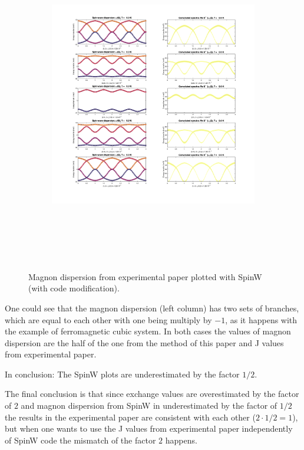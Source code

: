 \documentclass[a4paper,12pt]{article}
\begin{document}
            \begin{figure}[H]
                \centering
                \begin{subfigure}[b]{0.8\textwidth}
                    \centering
                    \includegraphics[height=14cm]{spinw-exp-after.png}
                \end{subfigure}
                \hfill
                \caption{Magnon dispersion from experimental paper plotted with SpinW (with code modification).}
                \label{fig:spinw-exp-after}
            \end{figure}

            One could see that the magnon dispersion (left column) has two sets of branches, 
            which are equal to each other with one being multiply by $-1$, as it happens with the example of ferromagnetic cubic system.
            In both cases the values of magnon dispersion are the half of the one from the method of this paper and J values from experimental paper. 

            In conclusion: The SpinW plots are underestimated by the factor $1/2$.

        The final conclusion is that since exchange values are overestimated by the factor of $2$ and magnon dispersion 
        from SpinW in underestimated by the factor of $1/2$ the results in the experimental paper are consistent with each other ($2 \cdot 1/2 = 1$), 
        but when one wants to use the J values from experimental paper independently of SpinW code the mismatch of the factor $2$ happens.



    

    

    \newpage
     
     
\end{document}
